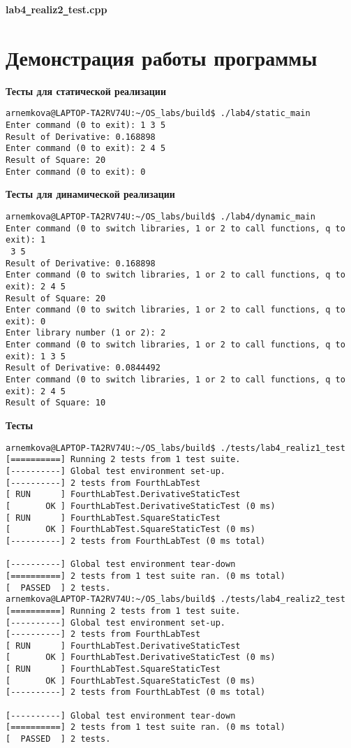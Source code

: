 \documentclass[a4paper, 14pt]{article}
\begin{document}
\textbf{lab4\texttt{\_}realiz2\texttt{\_}test.cpp}



\section*{Демонстрация работы программы}

\textbf{Тесты для статической реализации}

\begin{verbatim}
arnemkova@LAPTOP-TA2RV74U:~/OS_labs/build$ ./lab4/static_main
Enter command (0 to exit): 1 3 5
Result of Derivative: 0.168898
Enter command (0 to exit): 2 4 5
Result of Square: 20
Enter command (0 to exit): 0
\end{verbatim}

\textbf{Тесты для динамической реализации}

\begin{verbatim}
arnemkova@LAPTOP-TA2RV74U:~/OS_labs/build$ ./lab4/dynamic_main
Enter command (0 to switch libraries, 1 or 2 to call functions, q to exit): 1
 3 5
Result of Derivative: 0.168898
Enter command (0 to switch libraries, 1 or 2 to call functions, q to exit): 2 4 5
Result of Square: 20
Enter command (0 to switch libraries, 1 or 2 to call functions, q to exit): 0
Enter library number (1 or 2): 2
Enter command (0 to switch libraries, 1 or 2 to call functions, q to exit): 1 3 5
Result of Derivative: 0.0844492
Enter command (0 to switch libraries, 1 or 2 to call functions, q to exit): 2 4 5
Result of Square: 10
\end{verbatim}

\textbf{Тесты}

\begin{verbatim}
arnemkova@LAPTOP-TA2RV74U:~/OS_labs/build$ ./tests/lab4_realiz1_test
[==========] Running 2 tests from 1 test suite.
[----------] Global test environment set-up.
[----------] 2 tests from FourthLabTest
[ RUN      ] FourthLabTest.DerivativeStaticTest
[       OK ] FourthLabTest.DerivativeStaticTest (0 ms)
[ RUN      ] FourthLabTest.SquareStaticTest
[       OK ] FourthLabTest.SquareStaticTest (0 ms)
[----------] 2 tests from FourthLabTest (0 ms total)

[----------] Global test environment tear-down
[==========] 2 tests from 1 test suite ran. (0 ms total)
[  PASSED  ] 2 tests.
arnemkova@LAPTOP-TA2RV74U:~/OS_labs/build$ ./tests/lab4_realiz2_test
[==========] Running 2 tests from 1 test suite.
[----------] Global test environment set-up.
[----------] 2 tests from FourthLabTest
[ RUN      ] FourthLabTest.DerivativeStaticTest
[       OK ] FourthLabTest.DerivativeStaticTest (0 ms)
[ RUN      ] FourthLabTest.SquareStaticTest
[       OK ] FourthLabTest.SquareStaticTest (0 ms)
[----------] 2 tests from FourthLabTest (0 ms total)

[----------] Global test environment tear-down
[==========] 2 tests from 1 test suite ran. (0 ms total)
[  PASSED  ] 2 tests.
\end{verbatim}
\end{document}

